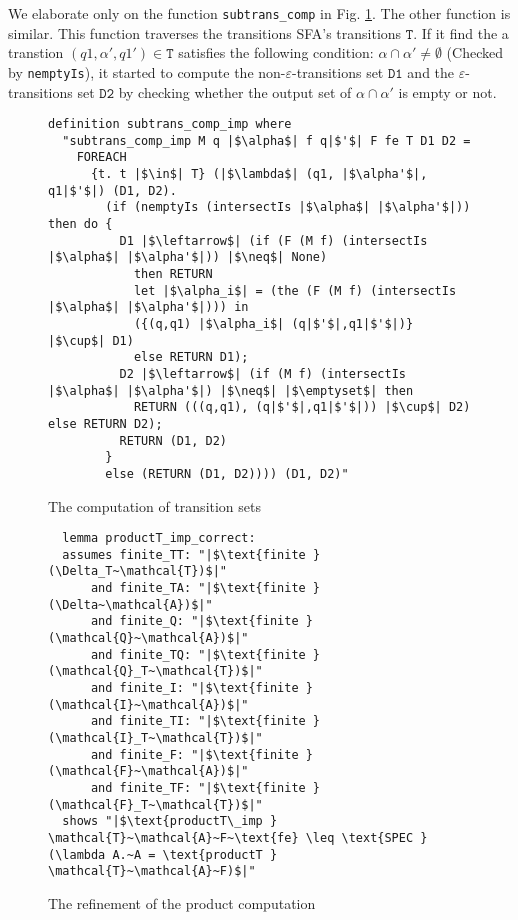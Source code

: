 \documentclass[a4paper,UKenglish,cleveref, autoref, thm-restate]{lipics-v2021}
\begin{document}
We elaborate only on the function \texttt{subtrans\_comp} in Fig. \ref{fig-def-subtrans_comp}. The other function is similar. 
This function traverses the transitions SFA's transitions $\texttt{T}$. If it find the a transtion $(q1, \alpha', q1')\in \texttt{T}$ satisfies the following condition:
$\alpha \cap \alpha' \neq \emptyset$ (Checked by \texttt{nemptyIs}),
it started to compute the non-$\varepsilon$-transitions set $\texttt{D1}$ and the $\varepsilon$-transitions set $\texttt{D2}$ by checking whether the output set of $\alpha \cap \alpha'$ is empty or not.


\begin{figure}[hbt!]
	\begin{lstlisting}
definition subtrans_comp_imp where
  "subtrans_comp_imp M q |$\alpha$| f q|$'$| F fe T D1 D2 =
    FOREACH
      {t. t |$\in$| T} (|$\lambda$| (q1, |$\alpha'$|, q1|$'$|) (D1, D2).
        (if (nemptyIs (intersectIs |$\alpha$| |$\alpha'$|)) then do {
          D1 |$\leftarrow$| (if (F (M f) (intersectIs |$\alpha$| |$\alpha'$|)) |$\neq$| None) 
            then RETURN 
            let |$\alpha_i$| = (the (F (M f) (intersectIs |$\alpha$| |$\alpha'$|))) in
            ({(q,q1) |$\alpha_i$| (q|$'$|,q1|$'$|)} |$\cup$| D1)
            else RETURN D1);
          D2 |$\leftarrow$| (if (M f) (intersectIs |$\alpha$| |$\alpha'$|) |$\neq$| |$\emptyset$| then 
            RETURN (((q,q1), (q|$'$|,q1|$'$|)) |$\cup$| D2) else RETURN D2);
          RETURN (D1, D2)
        }
        else (RETURN (D1, D2)))) (D1, D2)"
    \end{lstlisting}
    \caption{The computation of transition sets}
    \label{fig-def-subtrans_comp}
    \end{figure}


 

  \begin{figure}[hbt!]
    \begin{lstlisting}
  lemma productT_imp_correct:
  assumes finite_TT: "|$\text{finite } (\Delta_T~\mathcal{T})$|"    
      and finite_TA: "|$\text{finite } (\Delta~\mathcal{A})$|"
      and finite_Q: "|$\text{finite } (\mathcal{Q}~\mathcal{A})$|"
      and finite_TQ: "|$\text{finite } (\mathcal{Q}_T~\mathcal{T})$|"
      and finite_I: "|$\text{finite } (\mathcal{I}~\mathcal{A})$|"
      and finite_TI: "|$\text{finite } (\mathcal{I}_T~\mathcal{T})$|"
      and finite_F: "|$\text{finite } (\mathcal{F}~\mathcal{A})$|"
      and finite_TF: "|$\text{finite } (\mathcal{F}_T~\mathcal{T})$|"
  shows "|$\text{productT\_imp } \mathcal{T}~\mathcal{A}~F~\text{fe} \leq \text{SPEC } (\lambda A.~A = \text{productT } \mathcal{T}~\mathcal{A}~F)$|"
  \end{lstlisting}
  \caption{The refinement of the product computation}
  \label{fig-def-productT_imp_correct}
  \end{figure}
\end{document}
